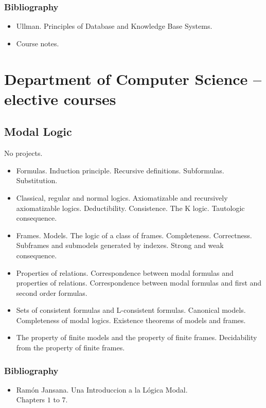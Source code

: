 \documentclass[spanish]{article}
\begin{document}
\subsubsection{Bibliography}
\begin{itemize}
  \item Ullman. Principles of Database and Knowledge Base Systems.\\
  \item Course notes.

\end{itemize}

\hrulefill%

\section{Department of Computer Science -- elective courses}

\subsection{Modal Logic}
No projects.

\begin{itemize}
  \item Formulas. Induction principle. Recursive definitions. Subformulas. Substitution.
  \item Classical, regular and normal logics. Axiomatizable and recursively axiomatizable
    logics. Deductibility. Consistence. The K logic. Tautologic consequence.
  \item Frames. Models. The logic of a class of frames. Completeness. Correctness. Subframes
    and submodels generated by indexes. Strong and weak consequence.
  \item Properties of relations. Correspondence between modal formulas and properties of
    relations. Correspondence between modal formulas and first and second order formulas.
  \item Sets of consistent formulas and L-consistent formulas. Canonical models.
    Completeness of modal logics. Existence theorems of models and frames.
  \item The property of finite models and the property of finite frames. Decidability from
    the property of finite frames.
\end{itemize}

\subsubsection{Bibliography}
\begin{itemize}
  \item Ram\'on Jansana. Una Introduccion a la L\'ogica Modal.\\
    Chapters $1$ to $7$.
\end{itemize}
\end{document}
